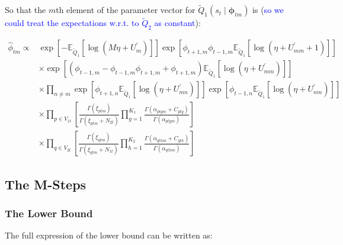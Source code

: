 \documentclass{article}
\begin{document}
So that the $m$th element of the parameter vector for $\widetilde{Q}_1(s_t \mid \mathbf{\phi}_{tm})$ is ({\textcolor{blue}{so  we could treat the expectations w.r.t. to $\tilde Q_2$ as constant}}):

\begin{equation*}
\begin{aligned} 
\hat{\phi}_{t m} \propto & \exp \left[-\mathbb{E}_{\tilde{Q}_{1}}\left[\log \left(M \eta+U_{m}^{\prime}\right)\right]\right] \exp \left[\phi_{t+1, m} \phi_{t-1, m} \mathbb{E}_{\tilde{Q}_{1}}\left[\log \left(\eta+U_{m m}^{\prime}+1\right)\right]\right] \\ 
& \times \exp \left[\left(\phi_{t-1, m}-\phi_{t-1, m} \phi_{t+1, m}+\phi_{t+1, m}\right) \mathbb{E}_{\tilde{Q}_{1}}\left[\log \left(\eta+U_{m m}^{\prime}\right)\right]\right] \\ 
& \times \prod_{n \neq m} \exp \left[\phi_{t+1, n} \mathbb{E}_{\tilde{Q}_{1}}\left[\log \left(\eta+U_{m n}^{\prime}\right)\right]\right] \exp \left[\phi_{t-1, n} \mathbb{E}_{\tilde{Q}_{1}}\left[\log \left(\eta+U_{n m}^{\prime}\right)\right]\right] \\ 
& \times \prod_{p \in V_{1t}} \left[ \frac{\Gamma\left(\xi_{ptm}\right)}{\Gamma \left( \xi_{ptm} + N_{2t} \right)}\prod_{g=1}^{K_1}\frac{ \Gamma\left( \alpha_{ptgm} + C_{ptg} \right)}{\Gamma\left(\alpha_{ptgm}\right)}  \right] \\
&\times \prod_{q \in V_{2t}}  \left[ \frac{\Gamma\left(\xi_{qtm}\right)}{\Gamma \left( \xi_{qtm} + N_{1t} \right)}\prod_{h=1}^{K_2}\frac{ \Gamma\left( \alpha_{qthm} + C_{qth} \right)}{\Gamma\left(\alpha_{qthm}\right)}  \right]
\end{aligned}
\end{equation*}


\subsection{The M-Steps}

\subsubsection{The Lower Bound}

The full expression of the lower bound can be written as:
\end{document}
